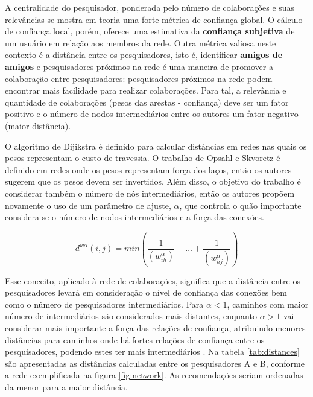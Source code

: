 \documentclass[12pt]{article}
\begin{document}
A centralidade do pesquisador, ponderada pelo número de colaborações e suas relevâncias se mostra em teoria uma forte métrica de 
confiança global. O cálculo de confiança local, porém, oferece uma estimativa da \textbf{confiança subjetiva} de um usuário em 
relação aos membros da rede. Outra métrica valiosa neste contexto é a distância entre os pesquisadores, isto é, identificar 
\textbf{amigos de amigos} e pesquisadores próximos na rede é uma maneira de promover a colaboração entre pesquisadores: 
pesquisadores próximos na rede podem encontrar mais facilidade para realizar colaborações. Para tal, a relevância e quantidade de 
colaborações (pesos das arestas - confiança) deve ser um fator positivo e o número de nodos intermediários entre os autores um 
fator negativo (maior distância).

O algoritmo de Dijikstra \cite{dijkstra1959note} é definido para calcular distâncias em redes nas quais os pesos representam o 
custo de travessia. O trabalho de Opsahl e Skvoretz \cite{opsahl2010node} é definido em redes onde os pesos representam força 
dos laços, então os autores sugerem que os pesos devem ser invertidos. Além disso, o objetivo do trabalho é considerar também 
o número de nós intermediários, então os autores propõem novamente o uso de um parâmetro de ajuste, $\alpha$, que controla o quão 
importante considera-se o número de nodos intermediários e a força das conexões.

\begin{equation} \label{eqn:distance}
  d^{w\alpha}(i, j) = min \left( \frac{1}{ \left( w_{ih}^{\alpha} \right) } + \dots + \frac{1}{ \left( w_{hj}^{\alpha} \right) }  \right) 
\end{equation}

Esse conceito, aplicado à rede de colaborações, significa que a distância entre os pesquisadores levará em consideração o nível 
de confiança das conexões bem como o número de pesquisadores intermediários. Para $\alpha < 1$, caminhos com maior número de 
intermediários são considerados mais distantes, enquanto $\alpha > 1$ vai considerar mais importante a força das relações de 
confiança, atribuindo menores distâncias para caminhos onde há fortes relações de confiança entre os pesquisadores, podendo estes 
ter mais intermediários \cite{opsahl2010node}. Na tabela \ref{tab:distances} são apresentadas as distâncias calculadas entre os 
pesquisadores A e B, conforme a rede exemplificada na figura \ref{fig:network}. As recomendações seriam ordenadas da menor para a 
maior distância.
\end{document}
